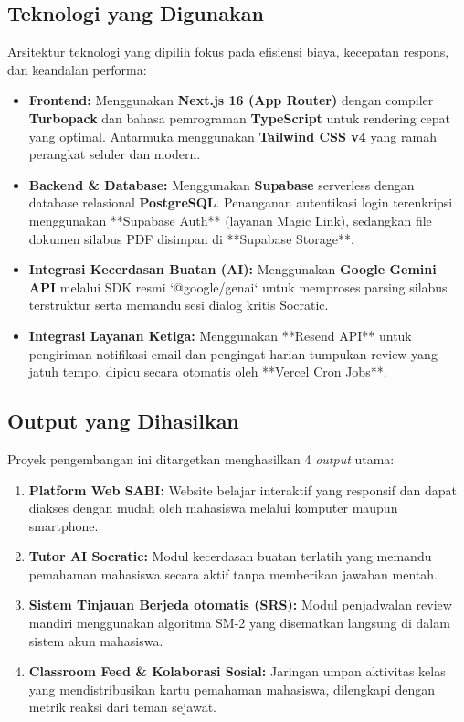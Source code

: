\documentclass[12pt,a4paper]{article}
\begin{document}
\subsection{Teknologi yang Digunakan}
Arsitektur teknologi yang dipilih fokus pada efisiensi biaya, kecepatan respons, dan keandalan performa:
\begin{itemize}
    \item \textbf{Frontend:}
    Menggunakan \textbf{Next.js 16 (App Router)} dengan compiler \textbf{Turbopack} dan bahasa pemrograman \textbf{TypeScript} untuk rendering cepat yang optimal. Antarmuka menggunakan \textbf{Tailwind CSS v4} yang ramah perangkat seluler dan modern.
    \item \textbf{Backend \& Database:}
    Menggunakan \textbf{Supabase} serverless dengan database relasional \textbf{PostgreSQL}. Penanganan autentikasi login terenkripsi menggunakan **Supabase Auth** (layanan Magic Link), sedangkan file dokumen silabus PDF disimpan di **Supabase Storage**.
    \item \textbf{Integrasi Kecerdasan Buatan (AI):}
    Menggunakan \textbf{Google Gemini API} melalui SDK resmi `@google/genai` untuk memproses parsing silabus terstruktur serta memandu sesi dialog kritis Socratic.
    \item \textbf{Integrasi Layanan Ketiga:}
    Menggunakan **Resend API** untuk pengiriman notifikasi email dan pengingat harian tumpukan review yang jatuh tempo, dipicu secara otomatis oleh **Vercel Cron Jobs**.
\end{itemize}

\subsection{Output yang Dihasilkan}
Proyek pengembangan ini ditargetkan menghasilkan 4 \textit{output} utama:
\begin{enumerate}
    \item \textbf{Platform Web SABI:} Website belajar interaktif yang responsif dan dapat diakses dengan mudah oleh mahasiswa melalui komputer maupun smartphone.
    \item \textbf{Tutor AI Socratic:} Modul kecerdasan buatan terlatih yang memandu pemahaman mahasiswa secara aktif tanpa memberikan jawaban mentah.
    \item \textbf{Sistem Tinjauan Berjeda otomatis (SRS):} Modul penjadwalan review mandiri menggunakan algoritma SM-2 yang disematkan langsung di dalam sistem akun mahasiswa.
    \item \textbf{Classroom Feed \& Kolaborasi Sosial:} Jaringan umpan aktivitas kelas yang mendistribusikan kartu pemahaman mahasiswa, dilengkapi dengan metrik reaksi dari teman sejawat.
\end{enumerate}
\end{document}
